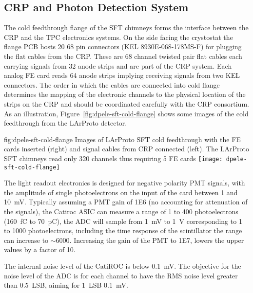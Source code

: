 \subsection{CRP and Photon Detection System}
\label{sec:fddp-tpc-elec-intfc-crppmt}

The cold feedthrough flange of the SFT chimneys forms the interface between the CRP and the TPC electronics systems. On the side facing the crystostat the flange PCB hosts \num{20} \num{68} pin connectors (KEL 8930E-068-178MS-F) for plugging the flat cables from the CRP. These are 68 channel twisted pair flat cables each carrying signals from \num{32} anode strips and are part of the CRP system. Each analog FE card reads \num{64} anode strips implying receiving signals from two KEL connectors. The order in which the cables are connected into cold flange determines the mapping of the electronic channels to the physical location of the strips on the CRP and should be coordinated carefully with the CRP consortium. As an illustration, Figure~\ref{fig:dpele-sft-cold-flange} shows some images of the cold feedthrough from the LArProto detector.

\begin{dunefigure}{fig:dpele-sft-cold-flange}
{Images of LArProto SFT cold feedthrough with the FE cards inserted (right) and signal cables from CRP connected (left). The LArProto SFT chimneys read only \num{320} channels thus requiring \num{5} FE cards}
\texttt{[image: dpele-sft-cold-flange]}
\end{dunefigure}

The light readout electronics is designed for negative polarity PMT signals, with the amplitude of single photoelectrons on the input of the card between \num{1} and \SI{10}{\milli\volt}. Typically assuming a PMT gain of \num{1E6} (no accounting for attenuation of the signals), the Catiroc ASIC can measure a range of \num{1} to \num{400} photoelectrons (\SI{160}{\femto\coulomb} to \SI{70}{\pico\coulomb}), the ADC will sample from \SI{1}{\milli\volt} to \SI{1}{\volt} corresponding to \num{1} to \num{1000} photoelectrons, including the time response of the scintillator the range can increase to $\sim$\num{6000}. Increasing the gain of the PMT to \num{1E7}, lowers the upper values by a factor of 10.

The internal noise level of the CatiROC is below \SI{0.1}{\milli\volt}. The objective for the noise level of the ADC is for each channel to have the RMS noise level greater than \SI{0.5}{LSB}, aiming for \SI{1}{LSB} \SI{0.1}{\milli\volt}.

